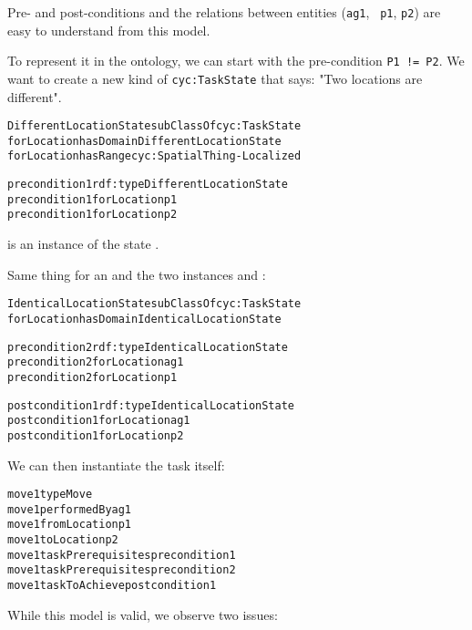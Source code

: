 Pre- and post-conditions and the relations between entities ({\tt ag1}, {\tt
p1}, {\tt p2}) are easy to understand from this model.

To represent it in the ontology, we can start with the pre-condition {\tt P1 != P2}. We want to create a new kind
of {\tt cyc:TaskState} that says: "Two locations are different".

\begin{alltt}

DifferentLocationState subClassOf cyc:TaskState
forLocation hasDomain DifferentLocationState
forLocation hasRange cyc:SpatialThing-Localized

precondition1 rdf:type DifferentLocationState
precondition1 forLocation p1
precondition1 forLocation p2

\end{alltt}

 is an instance of the state
.

Same thing for an  and the two instances
 and :



\begin{alltt}

IdenticalLocationState subClassOf cyc:TaskState
forLocation hasDomain IdenticalLocationState

precondition2 rdf:type IdenticalLocationState
precondition2 forLocation ag1
precondition2 forLocation p1

postcondition1 rdf:type IdenticalLocationState
postcondition1 forLocation ag1
postcondition1 forLocation p2

\end{alltt}

We can then instantiate the task itself:

\begin{alltt}

move1 type Move
move1 performedBy ag1
move1 fromLocation p1
move1 toLocation p2
move1 taskPrerequisites precondition1
move1 taskPrerequisites precondition2
move1 taskToAchieve postcondition1

\end{alltt}

While this model is valid, we observe two issues:


